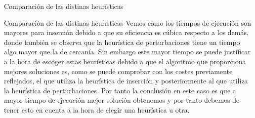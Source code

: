 \documentclass[10pt, xcolor=table]{beamer}
\begin{document}
 \begin{frame}[fragile]{Comparación de las distinas heurísticas}
\begin{table}[h!]
 	\centering
 	\footnotesize
 	\caption{Experiencia empírica de las distintas heurísticas}
 \end{table}
 
 \end{frame}
 \begin{frame}[fragile]{Comparación de las distinas heurísticas}
 Vemos como los tiempos de ejecución son mayores para inserción debido a que su eficiencia es cúbica respecto a los demás, donde también se observa que la heurística de perturbaciones tiene un tiempo algo mayor que la de cercanía. Sin embargo este mayor tiempo se puede justificar a la hora de escoger estas heurísticas debido a que el algoritmo que proporciona mejores soluciones es, como se puede comprobar con los costes previamente reflejados, el que utiliza la heurística de inserción y posteriormente al que utiliza la heurística de perturbaciones. Por tanto la conclusión en este caso es que a mayor tiempo de ejecución mejor solución obtenemos y por tanto debemos de tener esto en cuenta a la hora de elegir una heurística u otra.
\end{frame}
\end{document}
